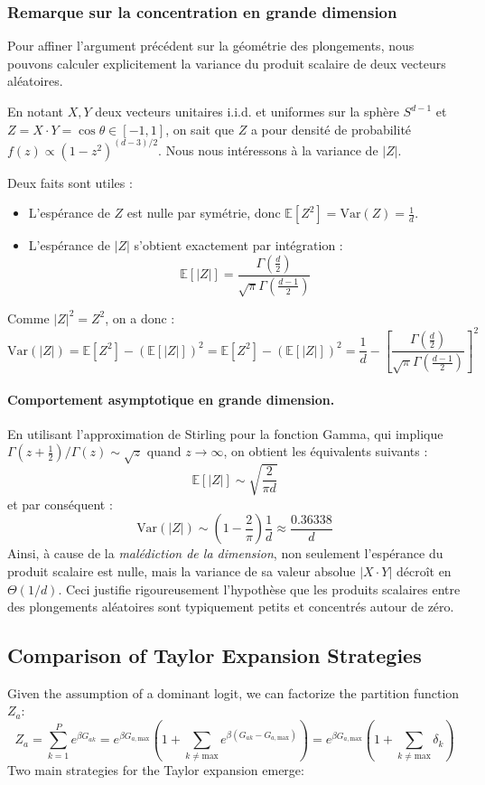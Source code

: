 \documentclass[12pt]{article}
\begin{document}
\subsubsection{Remarque sur la concentration en grande dimension}

Pour affiner l'argument précédent sur la géométrie des plongements, nous pouvons calculer explicitement la variance du produit scalaire de deux vecteurs aléatoires.

En notant $X, Y$ deux vecteurs unitaires i.i.d. et uniformes sur la sphère $S^{d-1}$ et $Z = X \cdot Y = \cos\theta \in [-1, 1]$, on sait que $Z$ a pour densité de probabilité $f(z) \propto (1-z^2)^{(d-3)/2}$. Nous nous intéressons à la variance de $|Z|$.

Deux faits sont utiles :
\begin{itemize}
    \item L'espérance de $Z$ est nulle par symétrie, donc $\mathbb{E}[Z^2] = \text{Var}(Z) = \frac{1}{d}$.
    \item L'espérance de $|Z|$ s'obtient exactement par intégration :
    \[
    \mathbb{E}[|Z|] = \frac{\Gamma(\frac{d}{2})}{\sqrt{\pi} \Gamma(\frac{d-1}{2})}
    \]
\end{itemize}
Comme $|Z|^2 = Z^2$, on a donc :
\[
\text{Var}(|Z|) = \mathbb{E}[Z^2] - (\mathbb{E}[|Z|])^2 = \mathbb{E}[Z^2] - (\mathbb{E}[|Z|])^2 = \frac{1}{d} - \left[ \frac{\Gamma(\frac{d}{2})}{\sqrt{\pi} \Gamma(\frac{d-1}{2})} \right]^2
\]

\paragraph{Comportement asymptotique en grande dimension.}
En utilisant l'approximation de Stirling pour la fonction Gamma, qui implique $\Gamma(z+\frac{1}{2}) / \Gamma(z) \sim \sqrt{z}$ quand $z \to \infty$, on obtient les équivalents suivants :
\[
\mathbb{E}[|Z|] \sim \sqrt{\frac{2}{\pi d}}
\]
et par conséquent :
\[
\text{Var}(|Z|) \sim \left(1 - \frac{2}{\pi}\right) \frac{1}{d} \approx \frac{0.36338}{d}
\]
Ainsi, à cause de la \textit{malédiction de la dimension}, non seulement l'espérance du produit scalaire est nulle, mais la variance de sa valeur absolue $|X \cdot Y|$ décroît en $\Theta(1/d)$. Ceci justifie rigoureusement l'hypothèse que les produits scalaires entre des plongements aléatoires sont typiquement petits et concentrés autour de zéro.

\subsection{Comparison of Taylor Expansion Strategies}
Given the assumption of a dominant logit, we can factorize the partition function $Z_a$:
\[
Z_a = \sum_{k=1}^{P} e^{\beta G_{ak}} = e^{\beta G_{a, \text{max}}} \left( 1 + \sum_{k \neq \text{max}} e^{\beta (G_{ak} - G_{a, \text{max}})} \right) = e^{\beta G_{a, \text{max}}} \left( 1 + \sum_{k \neq \text{max}} \delta_k \right)
\]
Two main strategies for the Taylor expansion emerge:
\end{document}
